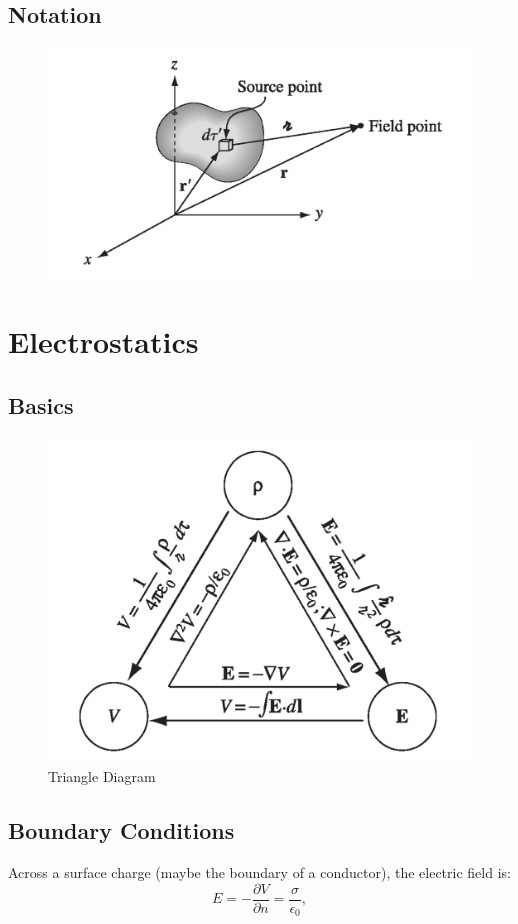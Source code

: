 \documentclass{report}
\begin{document}
\section{Notation}
\begin{figure}[h!]
    \centering
    \includegraphics[width = 0.6 \textwidth]{figure/Chapter1/notation.png}
\end{figure}






\chapter{Electrostatics}

\section{Basics}
\begin{figure}[h]
    \centering
    \includegraphics[width = 0.6 \textwidth]{figure/E_triangle_diagram.png}
    \caption{Triangle Diagram}
    \label{fig:E_triangle_diagram}
\end{figure}


\section{Boundary Conditions}

Across a surface charge (maybe the boundary of a conductor), the electric field is: 
\begin{equation}
    E = -\frac{\partial V}{\partial n} = \frac{\sigma}{\epsilon_0},
\end{equation}
\end{document}
